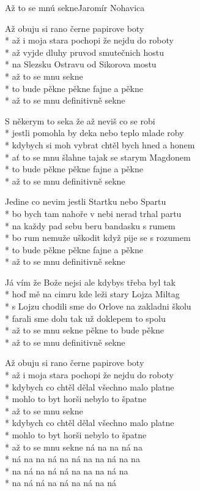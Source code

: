 \documentclass[10.5pt]{book}
\begin{document}
\iffalse
\begin{poem}{Až to se mnú sekne}{Jaromír Nohavica}

\settowidth{\versewidth}{s Lojzu chodili sme do Orlove na zakladni školu}

Až obuju si rano černe papirove boty\\*
až i moja stara pochopi že nejdu do roboty\\*
až vyjde dluhy pruvod smutečnich hostu\\*
na Slezsku Ostravu od Sikorova mostu\\*
až to se mnu sekne\\*
to bude pěkne pěkne fajne a pěkne\\*
až to se mnu definitivně sekne

S někerym to seka že až neviš co se robi\\*
jestli pomohla by deka nebo teplo mlade roby\\*
kdybych si moh vybrat chtěl bych hned a honem\\*
ať to se mnu šlahne tajak se starym Magdonem\\*
to bude pěkne pěkne fajne a pěkne\\*
až to se mnu definitivně sekne

Jedine co nevim jestli Startku nebo Spartu\\*
bo bych tam nahoře v nebi nerad trhal partu\\*
na každy pad sebu beru bandasku s rumem\\*
bo rum nemuže uškodit když pije se s rozumem\\*
to bude pěkne pěkne fajne a pěkne\\*
až to se mnu definitivně sekne

Já vím že Bože nejsi ale kdybys třeba byl tak\\*
hoď mě na cimru kde leži stary Lojza Miltag\\*
s Lojzu chodili sme do Orlove na zakladni školu\\*
farali sme dolu tak už doklepem to spolu\\*
až to se mnu sekne pěkne to bude pěkne\\*
až to se mnu definitivně sekne

Až obuju si rano černe papirove boty\\*
až i moja stara pochopi že nejdu do roboty\\*
kdybych co chtěl dělal všechno malo platne\\*
mohlo to byt horši nebylo to špatne\\*
až to se mnu sekne\\*
kdybych co chtěl dělal všechno malo platne\\*
mohlo to byt horši nebylo to špatne\\*
až to se mnu sekne ná na na ná na\\*
ná na na ná na ná na na ná na na\\*
na ná na ná ná na na na ná na\\*
na ná ná na ná na ná na ná

\end{poem}
\end{document}
